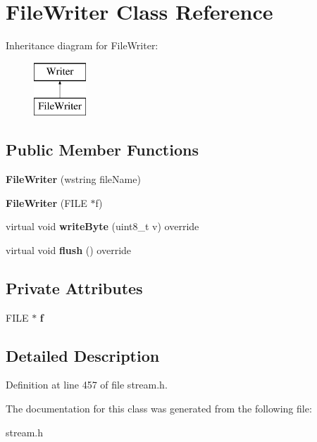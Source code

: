 \hypertarget{classFileWriter}{\section{File\+Writer Class Reference}
\label{classFileWriter}
}
Inheritance diagram for File\+Writer\+:\begin{figure}[H]
\begin{center}
\leavevmode
\includegraphics[height=2.000000cm]{classFileWriter}
\end{center}
\end{figure}
\subsection*{Public Member Functions}
\begin{DoxyCompactItemize}
\item 
\hypertarget{classFileWriter_ab0a4e83f39943112ea5c819193a9697f}{{\bfseries File\+Writer} (wstring file\+Name)}\label{classFileWriter_ab0a4e83f39943112ea5c819193a9697f}

\item 
\hypertarget{classFileWriter_a6debdb9c295717e24b43aae1cfaf5a51}{{\bfseries File\+Writer} (F\+I\+L\+E $\ast$f)}\label{classFileWriter_a6debdb9c295717e24b43aae1cfaf5a51}

\item 
\hypertarget{classFileWriter_a88fcc7992e16df7437c14d195fa99bad}{virtual void {\bfseries write\+Byte} (uint8\+\_\+t v) override}\label{classFileWriter_a88fcc7992e16df7437c14d195fa99bad}

\item 
\hypertarget{classFileWriter_ad001d5f1870bb8a84fa3f43c1fdca361}{virtual void {\bfseries flush} () override}\label{classFileWriter_ad001d5f1870bb8a84fa3f43c1fdca361}

\end{DoxyCompactItemize}
\subsection*{Private Attributes}
\begin{DoxyCompactItemize}
\item 
\hypertarget{classFileWriter_ab16f5fd381abbf2735908debe3805401}{F\+I\+L\+E $\ast$ {\bfseries f}}\label{classFileWriter_ab16f5fd381abbf2735908debe3805401}

\end{DoxyCompactItemize}


\subsection{Detailed Description}


Definition at line 457 of file stream.\+h.



The documentation for this class was generated from the following file\+:\begin{DoxyCompactItemize}
\item 
stream.\+h\end{DoxyCompactItemize}

